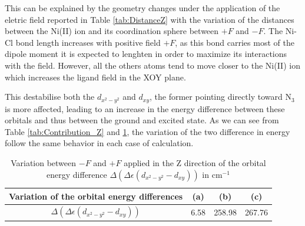 \documentclass[10pt]{report}
\numberwithin{equation}{section}
\begin{document}
This can be explained by the geometry changes under the application of the eletric field reported in Table \ref{tab:DistanceZ} with the variation of the distances between the Ni(II) ion and its coordination sphere between $+F$ and $-F$.
The Ni-Cl bond length increases with positive field $+F$, as this bond carries most of the dipole moment it is expected to lenghten in order to maximize its interactions with the field. 
However, all the others atoms tend to move closer to the Ni(II) ion which increases the ligand field in the XOY plane. 


This destabilise both the $d_{x^2-y^2}$ and $d_{xy}$, the former pointing directly toward N$_3$ is more affected, leading to an increase in the energy difference between these orbitals and thus between the ground and excited state.
As we can see from Table \ref{tab:Contribution_Z} and \ref{tab:EOrbitaleZ}, the variation of the two difference in energy follow the same behavior in each case of calculation.

\begin{table}[h]
    \centering
    \begin{tabular}{|c | c c c |}
        \hline
        Variation of the orbital energy differences & (a) & (b) & (c)\\
        \hline
        $\Delta(\Delta \epsilon (d_{x^2-y^2}-d_{xy}))$& 6.58 & 258.98 & 267.76\\
        \hline
    \end{tabular}
    \caption{Variation between $-F$ and $+F$ applied in the Z direction of the orbital energy difference $\Delta(\Delta \epsilon (d_{x^2-y^2}-d_{xy}))$ in cm$^{-1}$}
    \label{tab:EOrbitaleZ}
\end{table}
\end{document}
